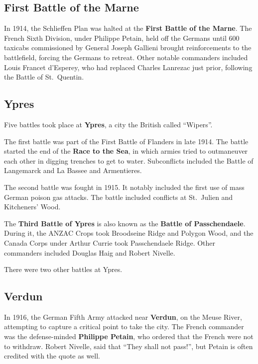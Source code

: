 \subsection*{First Battle of the Marne}

In 1914, the Schlieffen Plan was halted at the \textbf{First Battle of the Marne}.
The French Sixth Division, under Philippe Petain,
held off the Germans until 600 taxicabs commissioned by General Joseph Gallieni
brought reinforcements to the battlefield,
forcing the Germans to retreat.
Other notable commanders included Louis Francet d'Esperey,
who had replaced Charles Lanrezac just prior, following the Battle of St.\ Quentin.

\subsection*{Ypres}

Five battles took place at \textbf{Ypres}, a city the British called ``Wipers''.

The first battle was part of the First Battle of Flanders in late 1914.
The battle started the end of the \textbf{Race to the Sea},
in which armies tried to outmaneuver each other in digging trenches to get to water.
Subconflicts included the Battle of Langemarck and La Bassee and Armentieres.

The second battle was fought in 1915.
It notably included the first use of mass German poison gas attacks.
The battle included conflicts at St.\ Julien and Kitcheners' Wood.

The \textbf{Third Battle of Ypres} is also known as the \textbf{Battle of Passchendaele}.
During it, the ANZAC Crops took Broodseine Ridge and Polygon Wood,
and the Canada Corps under Arthur Currie took Passchendaele Ridge.
Other commanders included Douglas Haig and Robert Nivelle.

There were two other battles at Ypres.

\subsection*{Verdun}

In 1916, the German Fifth Army attacked near \textbf{Verdun}, on the Meuse River,
attempting to capture a critical point to take the city.
The French commander was the defense-minded \textbf{Philippe Petain},
who ordered that the French were not to withdraw.
Robert Nivelle, said that ``They shall not pass!'', but Petain is often credited with the quote as well.

